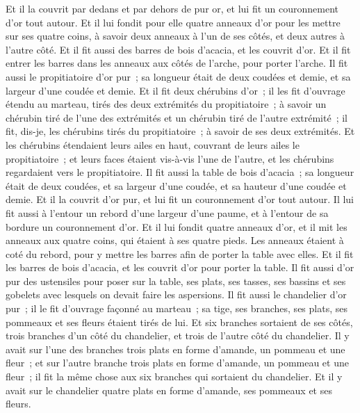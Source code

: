 \begin{multicols}{2}
Et il la couvrit par dedans et par dehors de pur or, et lui fit un couronnement d'or tout autour.
Et il lui fondit pour elle quatre anneaux d'or pour les mettre sur ses quatre coins, à savoir deux anneaux à l'un de ses côtés, et deux autres à l'autre côté.
Et il fit aussi des barres de bois d'acacia, et les couvrit d'or.
Et il fit entrer les barres dans les anneaux aux côtés de l'arche, pour porter l'arche.
Il fit aussi le propitiatoire d'or pur~; sa longueur était de deux coudées et demie, et sa largeur d'une coudée et demie.
Et il fit deux chérubins d'or~; il les fit d'ouvrage étendu au marteau, tirés des deux extrémités du propitiatoire~;
à savoir un chérubin tiré de l'une des extrémités et un chérubin tiré de l'autre extrémité~; il fit, dis-je, les chérubins tirés du propitiatoire~; à savoir de ses deux extrémités. 
Et les chérubins étendaient leurs ailes en haut, couvrant de leurs ailes le propitiatoire~; et leurs faces étaient vis-à-vis l'une de l'autre, et les chérubins regardaient vers le propitiatoire.
Il fit aussi la table de bois d'acacia~; sa longueur était de deux coudées, et sa largeur d'une coudée, et sa hauteur d'une coudée et demie.
Et il la couvrit d'or pur, et lui fit un couronnement d'or tout autour.
Il lui fit aussi à l'entour un rebord d'une largeur d'une paume, et à l'entour de sa bordure un couronnement d'or.
Et il lui fondit quatre anneaux d'or, et il mit les anneaux aux quatre coins, qui étaient à ses quatre pieds.
Les anneaux étaient à coté du rebord, pour y mettre les barres afin de porter la table avec elles.
Et il fit les barres de bois d'acacia, et les couvrit d'or pour porter la table.
Il fit aussi d'or pur des ustensiles pour poser sur la table, ses plats, ses tasses, ses bassins et ses gobelets avec lesquels on devait faire les aspersions.
Il fit aussi le chandelier d'or pur~; il le fit d'ouvrage façonné au marteau~; sa tige, ses branches, ses plats, ses pommeaux et ses fleurs étaient tirés de lui.
Et six branches sortaient de ses côtés, trois branches d'un côté du chandelier, et trois de l'autre côté du chandelier.
Il y avait sur l'une des branches trois plats en forme d'amande, un pommeau et une fleur~; et sur l'autre branche trois plats en forme d'amande, un pommeau et une fleur~; il fit la même chose aux six branches qui sortaient du chandelier.
Et il y avait sur le chandelier quatre plats en forme d'amande, ses pommeaux et ses fleurs.

\end{multicols}
